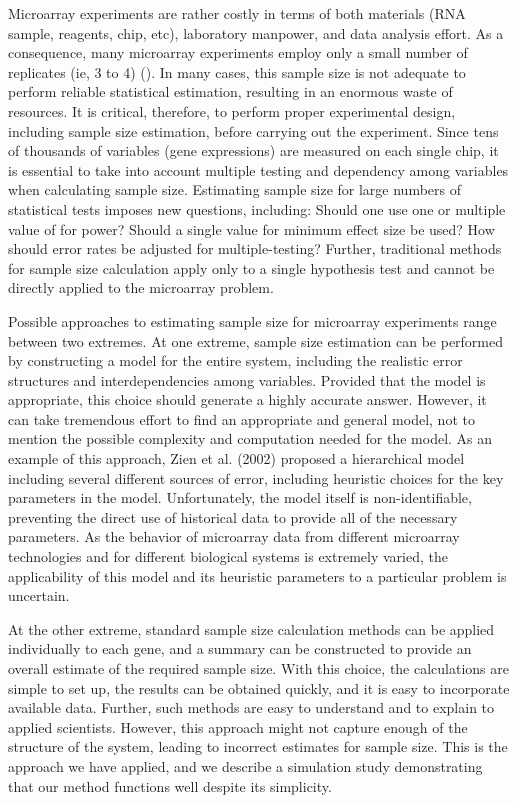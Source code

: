 \documentclass{bioinfo}
\begin{document}
Microarray experiments are rather costly in terms of both
materials (RNA sample, reagents, chip, etc), laboratory manpower,
and data analysis effort.  As a consequence, many microarray
experiments employ only a small number of replicates (ie, 3 to 4)
(\citealp{Mandel03}). In many cases, this sample size is not
adequate to perform reliable statistical estimation, resulting in
an enormous waste of resources. It is critical, therefore, to
perform proper experimental design, including sample size
estimation, before carrying out the experiment. Since tens of
thousands of variables (gene expressions) are measured on each
single chip, it is essential to take into account multiple testing
and dependency among variables when calculating sample size.
Estimating sample size for large numbers of statistical tests
imposes new questions, including: Should one use one or multiple
value of for power? Should a single value for minimum effect size
be used?  How should error rates be adjusted for multiple-testing?
 Further, traditional methods for sample size calculation apply only to a single hypothesis test
and cannot be directly applied to the microarray problem.

Possible approaches to estimating sample size for microarray
experiments range between two extremes. At one extreme, sample
size estimation can be performed by constructing a model for the
entire system, including the realistic error structures and
interdependencies among variables. Provided that the model is
appropriate, this choice should generate a highly accurate answer.
However, it can take tremendous effort to find an appropriate and
general model, not to mention the possible complexity and
computation needed for the model. As an example of this approach,
Zien et al.  (2002) proposed a hierarchical model including
several different sources of error, including heuristic choices
for the key parameters in the model. Unfortunately, the model
itself is non-identifiable, preventing the direct use of
historical data to provide all of the necessary parameters.  As
the behavior of microarray data from different microarray
technologies and for different biological systems is extremely
varied, the applicability of this model and its heuristic
parameters to a particular problem is uncertain.

At the other extreme, standard sample size calculation methods can
be applied individually to each gene, and a summary can be
constructed to provide an overall estimate of the required sample
size.  With this choice, the calculations are simple to set up,
the results can be obtained quickly, and it is easy to incorporate
available data. Further, such methods are easy to understand and
to explain to applied scientists.  However, this approach might
not capture enough of the structure of the system, leading to
incorrect estimates for sample size.  This is the approach we have
applied, and we describe a simulation study demonstrating that our
method functions well despite its simplicity.
\end{document}
